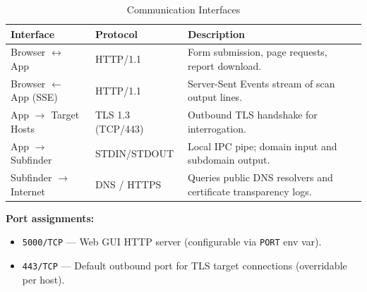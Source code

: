 \begin{table}[H]
  \centering
  \caption{Communication Interfaces}
  \label{tab:comm_interfaces}
  \begin{tabularx}{\textwidth}{L{3.5cm} L{2.5cm} L{8cm}}
    \toprule
    \textbf{Interface} & \textbf{Protocol} & \textbf{Description} \\
    \midrule
    Browser $\leftrightarrow$ App & HTTP/1.1 & Form submission, page requests,
                                               report download. \\
    Browser $\leftarrow$ App (SSE) & HTTP/1.1 & Server-Sent Events stream of
                                                scan output lines. \\
    App $\rightarrow$ Target Hosts & TLS 1.3 (TCP/443) & Outbound TLS
                                                          handshake for
                                                          interrogation. \\
    App $\rightarrow$ Subfinder & STDIN/STDOUT & Local IPC pipe; domain input
                                                 and subdomain output. \\
    Subfinder $\rightarrow$ Internet & DNS / HTTPS & Queries public DNS resolvers
                                                      and certificate transparency
                                                      logs. \\
    \bottomrule
  \end{tabularx}
\end{table}

\noindent\textbf{Port assignments:}
\begin{itemize}[noitemsep]
  \item \texttt{5000/TCP} — Web GUI HTTP server (configurable via \texttt{PORT}
        env var).
  \item \texttt{443/TCP} — Default outbound port for TLS target connections
        (overridable per host).
\end{itemize}
